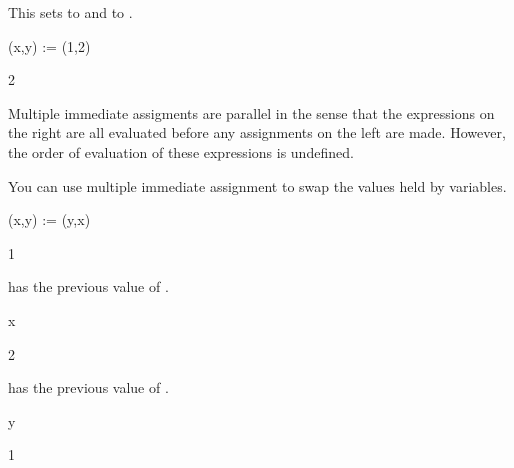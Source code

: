 {\begin{xtc}
\begin{xtccomment}
This sets  to  and  to .
\end{xtccomment}
\begin{spadsrc}
(x,y) := (1,2) 
\end{spadsrc}
\begin{TeXOutput}
\begin{fricasmath}{12}
2%
\end{fricasmath}
\end{TeXOutput}
\end{xtc}
Multiple immediate assigments are parallel in the sense that the
expressions on the right are all evaluated before any assignments
on the left are made.
However, the order of evaluation of these expressions is undefined.
\begin{xtc}
\begin{xtccomment}
You can use multiple immediate assignment to swap the
values held by variables.
\end{xtccomment}
\begin{spadsrc}
(x,y) := (y,x) 
\end{spadsrc}
\begin{TeXOutput}
\begin{fricasmath}{13}
1%
\end{fricasmath}
\end{TeXOutput}
\end{xtc}
\begin{xtc}
\begin{xtccomment}
 has the previous value of .
\end{xtccomment}
\begin{spadsrc}
x 
\end{spadsrc}
\begin{TeXOutput}
\begin{fricasmath}{14}
2%
\end{fricasmath}
\end{TeXOutput}
\end{xtc}
\begin{xtc}
\begin{xtccomment}
 has the previous value of .
\end{xtccomment}
\begin{spadsrc}
y 
\end{spadsrc}
\begin{TeXOutput}
\begin{fricasmath}{15}
1%
\end{fricasmath}
\end{TeXOutput}
\end{xtc}

}
